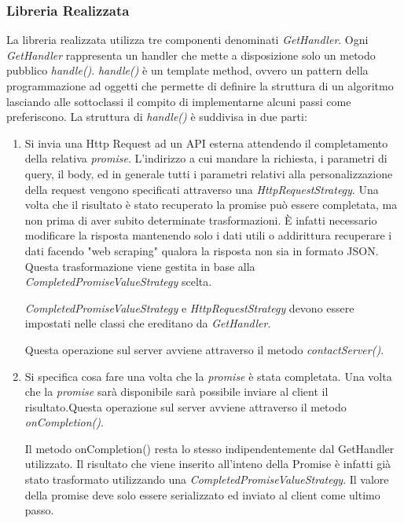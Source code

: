 \subsubsection{Libreria Realizzata}
La libreria realizzata utilizza tre componenti denominati \textit{GetHandler}. Ogni \textit{GetHandler} rappresenta un handler che mette a disposizione solo un metodo pubblico \textit{handle()}. \textit{handle()} è un template method, ovvero un pattern della programmazione ad oggetti che permette di definire la struttura di un algoritmo lasciando alle sottoclassi il compito di implementarne alcuni passi come preferiscono.\newline
La struttura di \textit{handle()} è suddivisa in due parti:
\begin{enumerate}
    \item Si invia una Http Request ad un API esterna attendendo il completamento della relativa \textit{promise}. L'indirizzo a cui mandare la richiesta, i parametri di query, il body, ed in generale tutti i parametri relativi alla personalizzazione della request vengono specificati attraverso una \textit{HttpRequestStrategy}. Una volta che il risultato è stato recuperato la promise può essere completata, ma non prima di aver subito determinate trasformazioni. È infatti necessario modificare la risposta mantenendo solo i dati utili o addirittura recuperare i dati facendo "web scraping" qualora la risposta non sia in formato JSON. Questa trasformazione viene gestita in base alla \textit{CompletedPromiseValueStrategy} scelta.
    \begin{info}[]
     \textit{CompletedPromiseValueStrategy} e \textit{HttpRequestStrategy} devono essere impostati nelle classi che ereditano da \textit{GetHandler}.
    \end{info}
    Questa operazione sul server avviene attraverso il metodo \textit{contactServer()}.
    \item Si specifica cosa fare una volta che la \textit{promise} è stata completata. Una volta che la \textit{promise} sarà disponibile sarà possibile inviare al client il risultato.\newline Questa operazione sul server avviene attraverso il metodo \textit{onCompletion()}.
    \begin{warn}
    Il metodo onCompletion() resta lo stesso indipendentemente dal GetHandler utilizzato. Il risultato che viene inserito all'inteno della Promise è infatti già stato trasformato utilizzando una \textit{CompletedPromiseValueStrategy}. Il valore della promise deve solo essere serializzato ed inviato al client come ultimo passo.
    \end{warn}
\end{enumerate}

